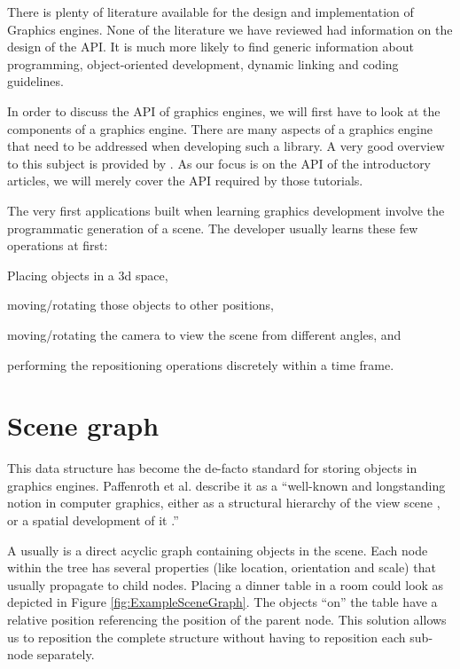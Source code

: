 There is plenty of literature available for the design and implementation of Graphics engines. None of the literature we have reviewed had information on the design of the API. It is much more likely to find generic information about programming\cite{Finney:2004:GPO:983901}, object-oriented development\cite{Eberly:2006:GED:1214590}, dynamic linking\cite{Zerbst:2004:GEP:983612} and coding guidelines\cite{Eberly:2004:GEA:1214185}.

In order to discuss the API of graphics engines, we will first have to look at the components of a graphics engine. There are many aspects of a graphics engine that need to be addressed when developing such a library. A very good overview to this subject is provided by \cite{bauchinger-2007-mre}. As our focus is on the API of the introductory articles, we will merely cover the API required by those tutorials.

The very first applications built when learning graphics development involve the programmatic generation of a scene. The developer usually learns these few operations at first:

\begin{smalllist}
	\item Placing objects in a 3d space,
	\item moving/rotating those objects to other positions,
	\item moving/rotating the camera to view the scene from different angles, and
	\item performing the repositioning operations discretely within a time frame.
\end{smalllist}

\section{Scene graph}

	 This data structure has become the de-facto standard for storing objects in graphics engines. Paffenroth et al. \cite{Paffenroth:2002:DSG:787261.787772} describe it as a ``well-known and longstanding notion in computer graphics, either as a structural hierarchy of the view scene \cite{Clay:1996:PLI:1435699.1437354}, or a spatial development of it \cite{Subramanian:1997:CDI:614267.614379}\cite{Sudarsky:1999:DSO:614273.614419}.''

	A  usually is a direct acyclic graph containing objects in the scene\cite{Strauss:1992:OGT:142920.134089}. Each node within the tree has several properties (like location, orientation and scale) that usually propagate to child nodes. Placing a dinner table in a room could look as depicted in Figure \ref{fig:ExampleSceneGraph}. The objects ``on'' the table have a relative position referencing the position of the parent node. This solution allows us to reposition the complete structure without having to reposition each sub-node separately.

